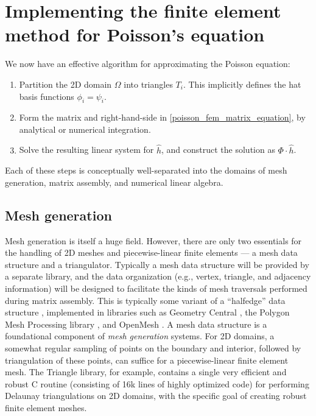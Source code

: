 \section{Implementing the finite element method for Poisson's equation}
We now have an effective algorithm for approximating the Poisson equation:
\begin{enumerate}
    \item Partition the 2D domain $\Omega$ into triangles $T_i$. This implicitly defines the hat basis functions $\phi_i = \psi_i$.
    \item Form the matrix and right-hand-side in \eqref{poisson_fem_matrix_equation}, by analytical or numerical integration.
    \item Solve the resulting linear system for $\hat{h}$, and construct the solution as $\Phi\cdot\hat{h}$.
\end{enumerate}
Each of these steps is conceptually well-separated into the domains of
mesh generation, matrix assembly, and numerical linear algebra.

\subsection{Mesh generation}
Mesh generation is itself a huge field. However, there are only two essentials for the handling of 2D meshes and piecewise-linear finite elements
--- a mesh data structure and a triangulator. Typically a mesh data structure will be provided by a separate library,
and the data organization (e.g., vertex, triangle, and adjacency information) will be designed to facilitate the kinds
of mesh traversals performed during matrix assembly. This is typically some variant of a ``halfedge'' data structure \cite{polygon_mesh_processing},
implemented in libraries such as Geometry Central \cite{geometry_central},
the Polygon Mesh Processing library \cite{polygon_mesh_processing_library}, and OpenMesh \cite{openmesh}.
A mesh data structure is a foundational component of \textit{mesh generation} systems. For 2D domains, a somewhat regular sampling of points on the boundary
and interior, followed by triangulation of these points, can suffice for a piecewise-linear finite element mesh.
The Triangle \cite{triangle} library, for example, contains a single very efficient and robust C routine (consisting of 16k lines of highly optimized code)
for performing Delaunay triangulations \cite{orourke}
on 2D domains,
with the specific goal of creating robust finite element meshes.


